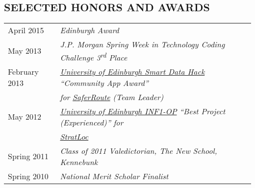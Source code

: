 \documentclass[line, margin]{res}
\newcommand{\ts}{\textsuperscript}
\begin{document}
\begin{resume}
\section{SELECTED HONORS AND AWARDS}
\begin{tabular}{@{}l l}
April 2015 & \textit{Edinburgh Award} \linebreak \\[5pt]
May 2013 & \textit{J.P. Morgan Spring Week in Technology Coding Challenge 3\ts{rd} Place}\linebreak \\[5pt]
February 2013 & \textit{\href{http://data.inf.ed.ac.uk/ilwhack/finalprojects.php}{University of Edinburgh Smart Data Hack} ``Community App Award''}\linebreak\\[1pt] 
&\textit{for \href{https://github.com/team-tusive/ilwhack}{SaferRoute} (Team Leader)} \linebreak \\[5pt]
May 2012 & \textit{\href{https://sites.google.com/site/2012oop/winners}{University of Edinburgh INF1-OP} ``Best Project (Experienced)'' for} \linebreak \\[1pt] 
 &\textit{\href{http://www.chasestevens.com/team2civ/}{StratLoc}} \linebreak \\[5pt]
Spring 2011 & \textit{Class of 2011 Valedictorian, The New School, Kennebunk} \\[5pt]
Spring 2010 & \textit{National Merit Scholar Finalist} \\[5pt]
\end{tabular}
\end{resume}
\end{document}
